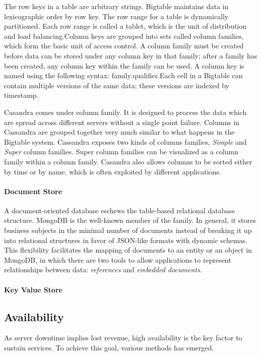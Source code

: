 \documentclass[12pt,letter]{article}
\begin{document}
The row keys in a table are arbitrary strings. Bigtable maintains data in lexicographic order by row key. The row range for a table is dynamically partitioned. Each row range is called a tablet, which is the unit of distribution and load balancing.Column keys are grouped into sets called column families, which form the basic unit of access control. A column family must be created before data can be stored under any column key in that family; after a family has been created, any column key within the family can be used. A column key is named using the following syntax: family:qualifier.Each cell in a Bigtable can contain multiple versions of the same data; these versions are indexed by timestamp.

Casandra comes under column family. It is designed to process the data which are spread across different servers without a single point failure. Columns in Cassandra are grouped together very much similar to what happens in the Bigtable system. Cassandra\citep{LakshamAvinash2010} exposes two kinds of columns families, \textit{Simple} and \textit{Super} column families. Super column families can be visualized as a column family within a column family. Casandra also allows columns to be sorted either by time or by name, which is often exploited by different applications.

\paragraph*{Document Store}
A document-oriented database eschews the table-based relational database structure. MongoDB is the well-known member of the family. In general, it stores business subjects in the minimal number of documents instead of breaking it up into relational structures\citep{Hoberman2014} in favor of JSON-like formats with dynamic schemas.\citep{Suter2012} This flexibility facilitates the mapping of documents to an entity or an object in MongoDB, in which there are two tools to allow applications to represent relationships between data: \textit{references} and \textit{embedded documents}.\citep{MongoDBInc.2009}

\paragraph*{Key Value Store}


\subsection{Availability}
As server downtime implies lost revenue, high availability is the key factor to sustain services. To achieve this goal, various methods has emerged.
\end{document}
